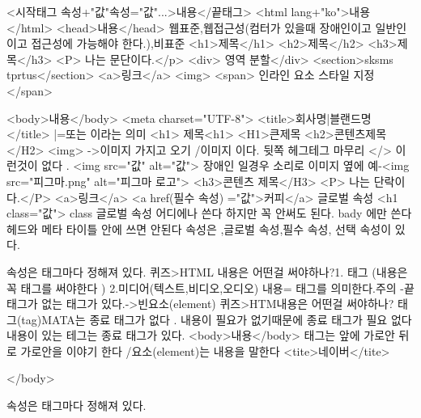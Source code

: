 <시작태그 속성+"값"속성="값"...>내용</끝태그>
<html lang+"ko">내용</html>
<head>내용</head>
웹표준,웹접근성(컴터가 있을때 장애인이고 일반인이고 접근성에 가능해야 한다.),비표준
<h1>제목</h1>
<h2>제목</h2>
<h3>제목</h3>
<P> 나는 문단이다.</p>
<div> 영역 분할</div>
<section>sksms tprtus</section>
<a>링크</a>
<img>
<span> 인라인 요소 스타일 지정 </span>

<body>내용</body>
<meta charset="UTF-8"> 
<title>회사명|블랜드명</title>       |=또는 이라는 의미
<h1> 제목<h1>       <H1>큰제목
<h2>콘텐츠제목</H2>
<img> ->이미지 가지고 오기 /이미지 이다. 뒷쪽 헤그테그 마무리 </> 이런것이 없다 .
<img src="값" alt="값">  장애인 일경우 소리로   이미지 옆에 
예-<img src="피그마.png" alt="피그마 로고">
<h3>콘텐츠 제목</H3>     
<P> 나는 단락이다.</P>
<a>링크</a>
<a href(필수 속성) ="값">커피</a>  
글로벌 속성 <h1 class="값">  class  글로벌 속성 어디에나 쓴다 하지만 꼭 안써도 된다.
bady 에만 쓴다 헤드와 메타 타이틀 안에 쓰면 안된다
속성은 ,글로벌 속성,필수 속성, 선택 속성이 있다.

속성은 태그마다 정해져 있다. 
퀴즈>HTML 내용은 어떤걸 써야하나?1. 태그   (내용은 꼭 태그를 써야한다 ) 2.미디어(텍스트,비디오,오디오)
내용= 태그를 의미한다.주의 -끝태그가 없는 태그가 있다.->빈요소(element) 퀴즈>HTM내용은 어떤걸 써야하나? 태그(tag)MATA는 종료 태그가 없다 . 내용이 필요가 없기때문에 종료 태그가 필요 없다 내용이 있는 테그는 종료 태그가 있다.
<body>내용</body> 태그는 앞에 가로안 뒤로 가로안을 이야기 한다 /요소(element)는 내용을 말한다 
<tite>네이버</tite>


</body>

속성은 태그마다 정해져 있다.

